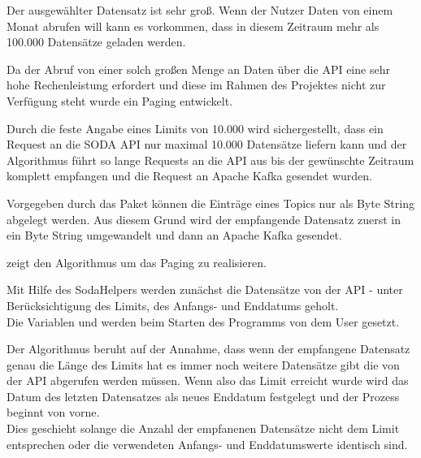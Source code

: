 Der ausgewählter Datensatz ist sehr groß.
Wenn \zb{} der Nutzer Daten von einem Monat abrufen will kann es vorkommen,
dass in diesem Zeitraum mehr als 100.000 Datensätze geladen werden.

Da der Abruf von einer solch großen Menge an Daten über die API eine sehr hohe Rechenleistung erfordert und diese im Rahmen des Projektes nicht zur Verfügung steht wurde
ein Paging entwickelt.

Durch die feste Angabe eines Limits von 10.000 wird sichergestellt, dass ein Request an die \ac{SODA} \ac{API} nur maximal 10.000
Datensätze liefern kann und der Algorithmus führt so lange Requests an die \ac{API} aus bis der gewünschte Zeitraum  komplett empfangen und
die Request an Apache Kafka gesendet wurden.

Vorgegeben durch das Paket  können die Einträge eines Topics nur als Byte String abgelegt werden.
Aus diesem Grund wird der empfangende Datensatz zuerst in ein Byte String umgewandelt und dann an Apache Kafka gesendet.

 zeigt den Algorithmus um das Paging zu realisieren.

Mit Hilfe des SodaHelpers werden zunächst die Datensätze von der \ac{API} - unter Berücksichtigung des Limits, des Anfangs- und Enddatums geholt.
\\
Die Variablen  und  werden beim Starten des Programms von dem User gesetzt.

Der Algorithmus beruht auf der Annahme, dass wenn der empfangene Datensatz genau die Länge des Limits hat es immer noch weitere Datensätze gibt die von der \ac{API} abgerufen werden müssen.
Wenn also das Limit erreicht wurde wird das Datum des letzten Datensatzes als neues Enddatum festgelegt und der Prozess beginnt von vorne.
\\
Dies geschieht solange die Anzahl der empfanenen Datensätze nicht dem Limit entsprechen
oder die verwendeten Anfangs- und Enddatumswerte identisch sind.



